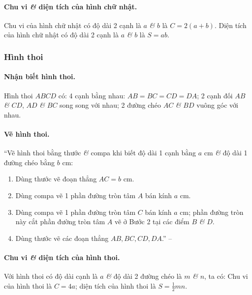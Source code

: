 \documentclass{article}
\numberwithin{equation}{section}
\begin{document}
\paragraph{Chu vi \textit{\&} diện tích của hình chữ nhật.} Chu vi của hình chữ nhật có độ dài 2 cạnh là $a$ \textit{\&} $b$ là $C = 2(a + b)$. Diện tích của hình chữ nhật có độ dài 2 cạnh là $a$ \textit{\&} $b$ là $S = ab$.

\subsubsection{Hình thoi}

\paragraph{Nhận biết hình thoi.} Hình thoi $ABCD$ có: 4 cạnh bằng nhau: $AB = BC = CD = DA$; 2 cạnh đối $AB$ \textit{\&} $CD$, $AD$ \textit{\&} $BC$ song song với nhau; 2 đường chéo $AC$ \textit{\&} $BD$ vuông góc với nhau.

\paragraph{Vẽ hình thoi.} ``Vẽ hình thoi bằng thước \textit{\&} compa khi biết độ dài 1 cạnh bằng $a$ cm \textit{\&} độ dài 1 đường chéo bằng $b$ cm:
\begin{enumerate}
	\item Dùng thước vẽ đoạn thẳng $AC = b$ cm.
	\item Dùng compa vẽ 1 phần đường tròn tâm $A$ bán kính $a$ cm.
	\item Dùng compa vẽ 1 phần đường tròn tâm $C$ bán kính $a$ cm; phần đường tròn này cắt phần đường tròn tâm $A$ vẽ ở Bước 2 tại các điểm $B$ \textit{\&} $D$.
	\item Dùng thước vẽ các đoạn thẳng $AB,BC,CD,DA$.'' -- \cite[p. 100]{SGK_Toan_6_Canh_Dieu_tap_1}
\end{enumerate}

\paragraph{Chu vi \textit{\&} diện tích của hình thoi.} Với hình thoi có độ dài cạnh là $a$ \textit{\&} độ dài 2 đường chéo là $m$ \textit{\&} $n$, ta có: Chu vi của hình thoi là $C = 4a$; diện tích của hình thoi là $S = \frac{1}{2}mn$.

\end{document}
